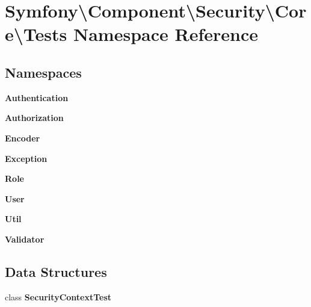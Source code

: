 \section{Symfony\textbackslash{}Component\textbackslash{}Security\textbackslash{}Core\textbackslash{}Tests Namespace Reference}
\label{namespace_symfony_1_1_component_1_1_security_1_1_core_1_1_tests}
\subsection*{Namespaces}
\begin{DoxyCompactItemize}
\item 
 {\bf Authentication}
\item 
 {\bf Authorization}
\item 
 {\bf Encoder}
\item 
 {\bf Exception}
\item 
 {\bf Role}
\item 
 {\bf User}
\item 
 {\bf Util}
\item 
 {\bf Validator}
\end{DoxyCompactItemize}
\subsection*{Data Structures}
\begin{DoxyCompactItemize}
\item 
class {\bf Security\+Context\+Test}
\end{DoxyCompactItemize}
